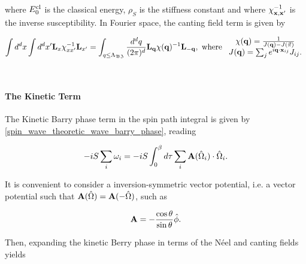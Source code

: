 where $E_0^{\textnormal{cl}}$ is the classical energy, $\rho_S$ is the stiffness constant and where $\chi_{{\bf x,x'}}^{-1}$ is the inverse susceptibility. In Fourier space, the canting field term is given by 

\begin{equation}
    \int d^d x \int d^d x' {\bf L}_x \chi_{xx'}^{-1} {\bf L}_{x'} = \int_{q \leq \Lambda_{\mathfrak{BZ}}} \frac{d^dq}{(2\pi)^d} {\bf L}_{\bf q} \chi({\bf q})^{-1} {\bf L}_{\bf -q}, \textnormal{ where } \begin{array}{cc}
         \chi({\bf q}) = \frac{1}{J({\bf q}) - J(\vec{\pi})}  \\
         J({\bf q}) = \sum_{j} e^{i {\bf q} \cdot {\bf x}_{ij}} J_{ij}.
    \end{array}
    \label{NLSM_fourier_integral_canting_fields_susceptibility}
\end{equation}

\blanky \\

\paragraph{The Kinetic Term}

The Kinetic Barry phase term in the spin path integral is given by \cref{spin_wave_theoretic_wave_barry_phase}, reading 

\begin{equation}
    -iS \sum_{i} \omega_i = -iS \int_{0}^\beta d\tau \sum_{i} {\bf A}(\hat{\Omega}_i) \cdot{\hat{\Omega}}_i.
\end{equation}

It is convenient to consider a inversion-symmetric vector potential, i.e. a vector potential such that ${\bf A}(\hat{\Omega}) = {\bf A}(-\hat{\Omega})$, such as 

$$
   {\bf A} = -\frac{\cos \theta}{\sin \theta} \hat{\phi}.
$$

Then, expanding the kinetic Berry phase in terms of the Néel and canting fields yields

